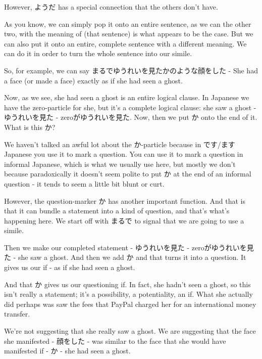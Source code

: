 However, ようだ has a special connection that the others don't have.

{}

As you know, we can simply pop it onto an entire sentence, as we can the other two, with the meaning of (that sentence) is what appears to be the case. But we can also put it onto an entire, complete sentence with a different meaning. We can do it in order to turn the whole sentence into our simile.

So, for example, we can say まるでゆうれいを見たかのような顔をした - She had a face (or made a face) exactly as if she had seen a ghost.

{}

Now, as we see, she had seen a ghost is an entire logical clause. In Japanese we have the zero-particle for she, but it's a complete logical clause: she saw a ghost - ゆうれいを見た - zeroがゆうれいを見た. Now, then we put か onto the end of it. What is this か?

\stopsectionlevel

\startsectionlevel[title={The か particle},reference={the-か-particle}]

We haven't talked an awful lot about the か-particle because in です/ます Japanese you use it to mark a question. You can use it to mark a question in informal Japanese, which is what we usually use here, but mostly we don't because paradoxically it doesn't seem polite to put か at the end of an informal question - it tends to seem a little bit blunt or curt.

However, the question-marker か has another important function. And that is that it can bundle a statement into a kind of question, and that's what's happening here. We start off with まるで to signal that we are going to use a simile.

Then we make our completed statement - ゆうれいを見た - zeroがゆうれいを見た - she saw a ghost. And then we add か and that turns it into a question. It gives us our if - as if she had seen a ghost.

And that か gives us our questioning if. In fact, she hadn't seen a ghost, so this isn't really a statement; it's a possibility, a potentiality, an if. What she actually did perhaps was saw the fees that PayPal charged her for an international money transfer.

We're not suggesting that she really saw a ghost. We are suggesting that the face she manifested - 顔をした - was similar to the face that she would have manifested if - か - she had seen a ghost.

